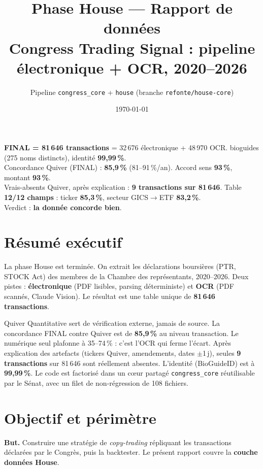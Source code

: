 \documentclass[11pt,a4paper]{article}
\title{\textbf{Phase House --- Rapport de données}\\[2pt]
\large Congress Trading Signal : pipeline électronique + OCR, 2020--2026}
\author{Pipeline \texttt{congress\_core} + \texttt{house} \quad (branche \texttt{refonte/house-core})}
\date{\today}
\begin{document}
\maketitle

\begin{tcolorbox}[colback=blue!4,colframe=blue!40!black,title=\textbf{Chiffres clés}]
\textbf{FINAL = 81\,646 transactions} = 32\,676 électronique + 48\,970 OCR. bioguides (275 noms distincts), identité \textbf{99,99\,\%}.\\
Concordance Quiver (FINAL) : \textbf{85,9\,\%} (81--91\,\%/an).\quad
Accord sens \textbf{93\,\%}, montant \textbf{93\,\%}.\\
Vrais-absents Quiver, après explication : \textbf{9 transactions sur 81\,646}.\quad
Table \textbf{12/12 champs} : ticker \textbf{85,3\,\%}, secteur GICS$\rightarrow$ETF \textbf{83,2\,\%}.\\
Verdict : \textbf{la donnée concorde bien}.
\end{tcolorbox}

\tableofcontents

\section{Résumé exécutif}
La phase House est terminée. On extrait les déclarations boursières (PTR, STOCK Act) des membres de
la Chambre des représentants, 2020--2026. Deux pistes : \textbf{électronique} (PDF lisibles, parsing
déterministe) et \textbf{OCR} (PDF scannés, Claude Vision). Le résultat est une table unique de
\textbf{81\,646 transactions}.

Quiver Quantitative sert de vérification externe, jamais de source. La concordance FINAL contre
Quiver est de \textbf{85,9\,\%} au niveau transaction. Le numérique seul plafonne à 35--74\,\% : c'est
l'OCR qui ferme l'écart. Après explication des artefacts (tickers Quiver, amendements, dates $\pm$1\,j),
seules \textbf{9 transactions} sur 81\,646 sont réellement absentes. L'identité (BioGuideID) est à
\textbf{99,99\,\%}. Le code est factorisé dans un cœur partagé \texttt{congress\_core} réutilisable par
le Sénat, avec un filet de non-régression de 108 fichiers.

\section{Objectif et périmètre}
\textbf{But.} Construire une stratégie de \emph{copy-trading} répliquant les transactions déclarées
par le Congrès, puis la backtester. Le présent rapport couvre la \textbf{couche données House}.
\end{document}
